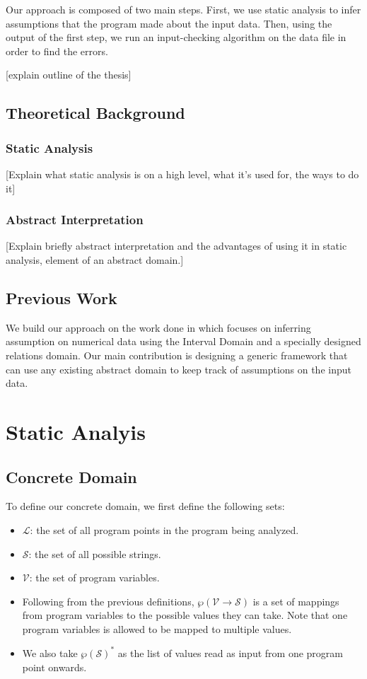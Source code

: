 \documentclass[10pt]{report}
\begin{document}
Our approach is composed of two main steps. First, we use static analysis to infer assumptions that the program made about the input data. Then, using the output of the first step, we run an input-checking algorithm on the data file in order to find the errors. 

[explain outline of the thesis]

\section{Theoretical Background}
\subsection{Static Analysis}
[Explain what static analysis is on a high level, what it's used for, the ways to do it]
\subsection{Abstract Interpretation}
[Explain briefly abstract interpretation and the advantages of using it in static analysis, element of an abstract domain.]

\section{Previous Work}

We build our approach on the work done in \cite{madelin} which focuses on inferring assumption on numerical data using the Interval Domain and a specially designed relations domain. Our main contribution is designing a generic framework that can use any existing abstract domain to keep track of assumptions on the input data. 

\chapter{Static Analyis}

\section{Concrete Domain} \label{concrete}

To define our concrete domain, we first define the following sets:
\begin{itemize}
	\item $\mathcal{L}$: the set of all program points in the program being analyzed. 
	\item $\mathcal{S}$: the set of all possible strings. 
	\item $\mathcal{V}$: the set of program variables.
	\item Following from the previous definitions, $\wp(\mathcal{V} \rightarrow \mathcal{S})$ is a set of mappings from program variables to the possible values they can take. Note that one program  variables is allowed to be mapped to multiple values. 
	\item We also take $\wp(\mathcal{S})^{*}$ as the list of values read as input from one program point onwards.  
\end{itemize}
\end{document}
